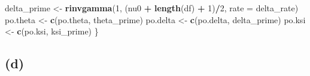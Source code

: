 \documentclass[
]{article}
\newenvironment{Shaded}{\begin{snugshade}}{\end{snugshade}}
\newcommand{\AttributeTok}[1]{\textcolor[rgb]{0.13,0.29,0.53}{#1}}
\newcommand{\DecValTok}[1]{\textcolor[rgb]{0.00,0.00,0.81}{#1}}
\newcommand{\FunctionTok}[1]{\textcolor[rgb]{0.13,0.29,0.53}{\textbf{#1}}}
\newcommand{\NormalTok}[1]{#1}
\newcommand{\OtherTok}[1]{\textcolor[rgb]{0.56,0.35,0.01}{#1}}
\newcommand{\SpecialCharTok}[1]{\textcolor[rgb]{0.81,0.36,0.00}{\textbf{#1}}}
\begin{document}
\begin{Shaded}
\begin{Highlighting}[]
\NormalTok{  delta\_prime }\OtherTok{\textless{}{-}} \FunctionTok{rinvgamma}\NormalTok{(}\DecValTok{1}\NormalTok{, (nu0 }\SpecialCharTok{+} \FunctionTok{length}\NormalTok{(df) }\SpecialCharTok{+} \DecValTok{1}\NormalTok{)}\SpecialCharTok{/}\DecValTok{2}\NormalTok{, }\AttributeTok{rate =}\NormalTok{ delta\_rate)}
\NormalTok{  po.theta }\OtherTok{\textless{}{-}} \FunctionTok{c}\NormalTok{(po.theta, theta\_prime)}
\NormalTok{  po.delta }\OtherTok{\textless{}{-}} \FunctionTok{c}\NormalTok{(po.delta, delta\_prime)}
\NormalTok{  po.ksi }\OtherTok{\textless{}{-}} \FunctionTok{c}\NormalTok{(po.ksi, ksi\_prime)}
\NormalTok{\}}
\end{Highlighting}
\end{Shaded}

\subsection{(d)}\label{d-2}
\end{document}
